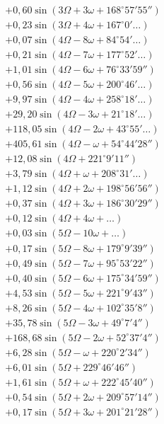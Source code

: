 \documentclass[10pt,a4paper]{article}
\begin{document}
\begin{align*}
&+ 0,60 \sin(3\Omega + 3\omega + 168^{\circ}57'55'') \\
&+ 0,23 \sin(3\Omega + 4\omega + 167^{\circ}0'\ldots) \\
&+ 0,07 \sin(4\Omega - 8\omega + 84^{\circ}54'\ldots) \\
&+ 0,21 \sin(4\Omega - 7\omega + 177^{\circ}52'\ldots) \\
&+ 1,01 \sin(4\Omega - 6\omega + 76^{\circ}33'59'') \\
&+ 0,56 \sin(4\Omega - 5\omega + 200^{\circ}46'\ldots) \\
&+ 9,97 \sin(4\Omega - 4\omega + 258^{\circ}18'\ldots) \\
&+ 29,20 \sin(4\Omega - 3\omega + 21^{\circ}18'\ldots) \\
&+ 118,05 \sin(4\Omega - 2\omega + 43^{\circ}55'\ldots) \\
&+ 405,61 \sin(4\Omega - \omega + 54^{\circ}44'28'') \\
&+ 12,08 \sin(4\Omega + 221^{\circ}9'11'') \\
&+ 3,79 \sin(4\Omega + \omega + 208^{\circ}31'\ldots) \\
&+ 1,12 \sin(4\Omega + 2\omega + 198^{\circ}56'56'') \\
&+ 0,37 \sin(4\Omega + 3\omega + 186^{\circ}30'29'') \\
&+ 0,12 \sin(4\Omega + 4\omega + \ldots) \\
&+ 0,03 \sin(5\Omega - 10\omega + \ldots) \\
&+ 0,17 \sin(5\Omega - 8\omega + 179^{\circ}9'39'') \\
&+ 0,49 \sin(5\Omega - 7\omega + 95^{\circ}53'22'') \\
&+ 0,40 \sin(5\Omega - 6\omega + 175^{\circ}34'59'') \\
&+ 4,53 \sin(5\Omega - 5\omega + 221^{\circ}9'43'') \\
&+ 8,26 \sin(5\Omega - 4\omega + 102^{\circ}35'8'') \\
&+ 35,78 \sin(5\Omega - 3\omega + 49^{\circ}7'4'') \\
&+ 168,68 \sin(5\Omega - 2\omega + 52^{\circ}37'4'') \\
&+ 6,28 \sin(5\Omega - \omega + 220^{\circ}2'34'') \\
&+ 6,01 \sin(5\Omega + 229^{\circ}46'46'') \\
&+ 1,61 \sin(5\Omega + \omega + 222^{\circ}45'40'') \\
&+ 0,54 \sin(5\Omega + 2\omega + 209^{\circ}57'14'') \\
&+ 0,17 \sin(5\Omega + 3\omega + 201^{\circ}21'28'') \\

\end{align*}
\end{document}
